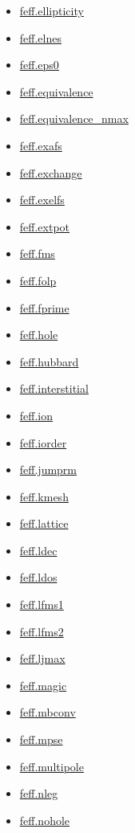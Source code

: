 \documentclass[11pt]{article}
\begin{document}
\begin{itemize}
\item \hyperref[kw:feff-ellipticity]{feff.ellipticity}
\item \hyperref[kw:feff-elnes]{feff.elnes}
\item \hyperref[kw:feff-eps0]{feff.eps0}
\item \hyperref[kw:feff-equivalence]{feff.equivalence}
\item \hyperref[kw:feff-equivalence-nmax]{feff.equivalence\_nmax}
\item \hyperref[kw:feff-exafs]{feff.exafs}
\item \hyperref[kw:feff-exchange]{feff.exchange}
\item \hyperref[kw:feff-exelfs]{feff.exelfs}
\item \hyperref[kw:feff-extpot]{feff.extpot}
\item \hyperref[kw:feff-fms]{feff.fms}
\item \hyperref[kw:feff-folp]{feff.folp}
\item \hyperref[kw:feff-fprime]{feff.fprime}
\item \hyperref[kw:feff-hole]{feff.hole}
\item \hyperref[kw:feff-hubbard]{feff.hubbard}
\item \hyperref[kw:feff-interstitial]{feff.interstitial}
\item \hyperref[kw:feff-ion]{feff.ion}
\item \hyperref[kw:feff-iorder]{feff.iorder}
\item \hyperref[kw:feff-jumprm]{feff.jumprm}
\item \hyperref[kw:feff-kmesh]{feff.kmesh}
\item \hyperref[kw:feff-lattice]{feff.lattice}
\item \hyperref[kw:feff-ldec]{feff.ldec}
\item \hyperref[kw:feff-ldos]{feff.ldos}
\item \hyperref[kw:feff-lfms1]{feff.lfms1}
\item \hyperref[kw:feff-lfms2]{feff.lfms2}
\item \hyperref[kw:feff-ljmax]{feff.ljmax}
\item \hyperref[kw:feff-magic]{feff.magic}
\item \hyperref[kw:feff-mbconv]{feff.mbconv}
\item \hyperref[kw:feff-mpse]{feff.mpse}
\item \hyperref[kw:feff-multipole]{feff.multipole}
\item \hyperref[kw:feff-nleg]{feff.nleg}
\item \hyperref[kw:feff-nohole]{feff.nohole}

\end{itemize}
\end{document}
